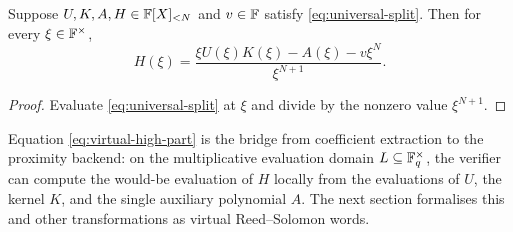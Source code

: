 \begin{corollary}
\label{cor:virtual-high-part}
Suppose $U,K,A,H\in\mathbb{F}[X]_{<N}$ and $v\in\mathbb{F}$ satisfy \eqref{eq:universal-split}.  Then for every $\xi\in\mathbb{F}^{\times}$,
\begin{equation}
  H(\xi)
  =\frac{\xi U(\xi)K(\xi)-A(\xi)-v\xi^N}{\xi^{N+1}}.
  \label{eq:virtual-high-part}
\end{equation}
\end{corollary}

\begin{proof}
Evaluate \eqref{eq:universal-split} at $\xi$ and divide by the nonzero value $\xi^{N+1}$.
\end{proof}

Equation \eqref{eq:virtual-high-part} is the bridge from coefficient extraction to the proximity backend: on the multiplicative evaluation domain $L\subseteq\mathbb{F}_q^{\times}$, the verifier can compute the would-be evaluation of $H$ locally from the evaluations of $U$, the kernel $K$, and the single auxiliary polynomial $A$.  The next section formalises this and other transformations as virtual Reed--Solomon words.
